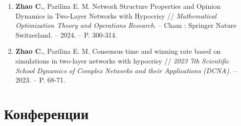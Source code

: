 \documentclass[letterpaper,10pt]{article}
\begin{document}
\begin{enumerate}[itemsep=2pt,parsep=0pt]
  \item \textbf{Zhao C.}, Parilina E. M. Network Structure Properties and Opinion Dynamics in Two-Layer Networks with Hypocrisy // {\it Mathematical Optimization Theory and Operations Research}. -- Cham : Springer Nature Switzerland. -- 2024. -- P. 300-314.
  \item \textbf{Zhao C.}, Parilina E. M. Consensus time and winning rate based on simulations in two-layer networks with hypocrisy // {\it 2023 7th Scientific School Dynamics of Complex Networks and their Applications (DCNA).} -- 2023. -- P. 68-71.
\end{enumerate}

\section{Конференции}
\end{document}
